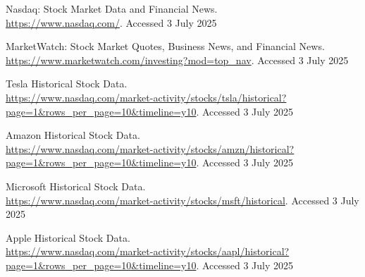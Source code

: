 \documentclass[runningheads]{llncs}
\begin{document}
\begin{thebibliography}{6}

Nasdaq: Stock Market Data and Financial News.\\
\url{https://www.nasdaq.com/}. Accessed 3 July 2025

MarketWatch: Stock Market Quotes, Business News, and Financial News.\\
\url{https://www.marketwatch.com/investing?mod=top_nav}. Accessed 3 July 2025

Tesla Historical Stock Data.\\
\url{https://www.nasdaq.com/market-activity/stocks/tsla/historical?page=1&rows_per_page=10&timeline=y10}. Accessed 3 July 2025

Amazon Historical Stock Data.\\
\url{https://www.nasdaq.com/market-activity/stocks/amzn/historical?page=1&rows_per_page=10&timeline=y10}. Accessed 3 July 2025

Microsoft Historical Stock Data.\\
\url{https://www.nasdaq.com/market-activity/stocks/msft/historical}. Accessed 3 July 2025

Apple Historical Stock Data.\\
\url{https://www.nasdaq.com/market-activity/stocks/aapl/historical?page=1&rows_per_page=10&timeline=y10}. Accessed 3 July 2025

\end{thebibliography}
\end{document}
